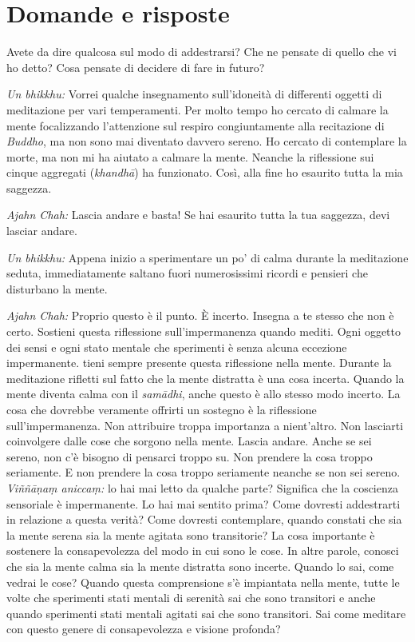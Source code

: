 \section{Domande e risposte}

Avete da dire qualcosa sul modo di addestrarsi? Che ne pensate di quello
che vi ho detto? Cosa pensate di decidere di fare in futuro?

\emph{Un bhikkhu:} Vorrei qualche insegnamento sull'idoneità di
differenti oggetti di meditazione per vari temperamenti. Per molto tempo
ho cercato di calmare la mente focalizzando l'attenzione sul respiro
congiuntamente alla recitazione di \emph{Buddho}, ma non sono mai
diventato davvero sereno. Ho cercato di contemplare la morte, ma non mi
ha aiutato a calmare la mente. Neanche la riflessione sui cinque
aggregati (\emph{khandhā}) ha funzionato. Così, alla fine ho esaurito
tutta la mia saggezza.

\emph{Ajahn Chah:} Lascia andare e basta! Se hai esaurito tutta la tua
saggezza, devi lasciar andare.

\emph{Un bhikkhu:} Appena inizio a sperimentare un po' di calma durante
la meditazione seduta, immediatamente saltano fuori numerosissimi
ricordi e pensieri che disturbano la mente.

\emph{Ajahn Chah:} Proprio questo è il punto. È incerto. Insegna a te stesso
che non è certo. Sostieni questa riflessione sull'impermanenza quando
mediti. Ogni oggetto dei sensi e ogni stato mentale che sperimenti è
senza alcuna eccezione impermanente. tieni sempre presente questa
riflessione nella mente. Durante la meditazione rifletti sul fatto che
la mente distratta è una cosa incerta. Quando la mente diventa calma con
il \emph{samādhi}, anche questo è allo stesso modo incerto. La cosa che
dovrebbe veramente offrirti un sostegno è la riflessione
sull'impermanenza. Non attribuire troppa importanza a nient'altro. Non
lasciarti coinvolgere dalle cose che sorgono nella mente. Lascia andare.
Anche se sei sereno, non c'è bisogno di pensarci troppo su. Non prendere
la cosa troppo seriamente. E non prendere la cosa troppo seriamente
neanche se non sei sereno. \emph{Viññāṇaṃ aniccaṃ:} lo hai mai letto da
qualche parte? Significa che la coscienza sensoriale è impermanente. Lo
hai mai sentito prima? Come dovresti addestrarti in relazione a questa
verità? Come dovresti contemplare, quando constati che sia la mente
serena sia la mente agitata sono transitorie? La cosa importante è
sostenere la consapevolezza del modo in cui sono le cose. In altre
parole, conosci che sia la mente calma sia la mente distratta sono
incerte. Quando lo sai, come vedrai le cose? Quando questa comprensione
s'è impiantata nella mente, tutte le volte che sperimenti stati mentali
di serenità sai che sono transitori e anche quando sperimenti stati
mentali agitati sai che sono transitori. Sai come meditare con questo
genere di consapevolezza e visione profonda?

